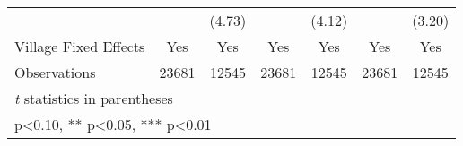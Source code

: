 \begin{table}[htbp]
\begin{tabular}{l*{6}{c}}
                &            &   (4.73)   &            &   (4.12)   &            &   (3.20)   \\
Village Fixed Effects&      Yes   &      Yes   &      Yes   &      Yes   &      Yes   &      Yes   \\
\midrule
Observations    &    23681   &    12545   &    23681   &    12545   &    23681   &    12545   \\
\bottomrule
\multicolumn{7}{l}{\footnotesize \textit{t} statistics in parentheses}\\
\multicolumn{7}{l}{\footnotesize * p<0.10, ** p<0.05, *** p<0.01}\\
\end{tabular}
\end{table}
